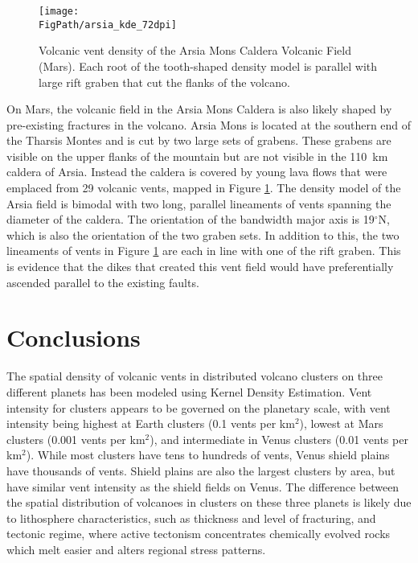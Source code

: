 \begin{figure}
\centering
\texttt{[image: \\FigPath/arsia\_kde\_72dpi]}
\caption[Volcanic vent density of the Arsia Mons Caldera Volcanic Field (Mars)]{Volcanic vent density of the Arsia Mons Caldera Volcanic Field (Mars). Each root of the tooth-shaped density model is parallel with large rift graben that cut the flanks of the volcano.}
\label{fig_arsiakde}
\end{figure}

On Mars, the volcanic field in the Arsia Mons Caldera is also likely shaped by pre-existing fractures in the volcano. Arsia Mons is located at the southern end of the Tharsis Montes and is cut by two large sets of grabens. These grabens are visible on the upper flanks of the mountain but are not visible in the 110~km caldera of Arsia. Instead the caldera is covered by young lava flows that were emplaced from 29 volcanic vents, mapped in Figure \ref{fig_arsiakde}. The density model of the Arsia field is bimodal with two long, parallel lineaments of vents spanning the diameter of the caldera. The orientation of the bandwidth major axis is 19$^{\circ}$N, which is also the orientation of the two graben sets. In addition to this, the two lineaments of vents in Figure \ref{fig_arsiakde} are each in line with one of the rift graben. This is evidence that the dikes that created this vent field would have preferentially ascended parallel to the existing faults.

\section{Conclusions}
The spatial density of volcanic vents in distributed volcano clusters on three different planets has been modeled using Kernel Density Estimation. Vent intensity for clusters appears to be governed on the planetary scale, with vent intensity being highest at Earth clusters (0.1 vents per km$^2$), lowest at Mars clusters (0.001 vents per km$^2$), and intermediate in Venus clusters (0.01 vents per km$^2$). While most clusters have tens to hundreds of vents, Venus shield plains have thousands of vents. Shield plains are also the largest clusters by area, but have similar vent intensity as the shield fields on Venus. The difference between the spatial distribution of volcanoes in clusters on these three planets is likely due to lithosphere characteristics, such as thickness and level of fracturing, and tectonic regime, where active tectonism concentrates chemically evolved rocks which melt easier and alters regional stress patterns.

